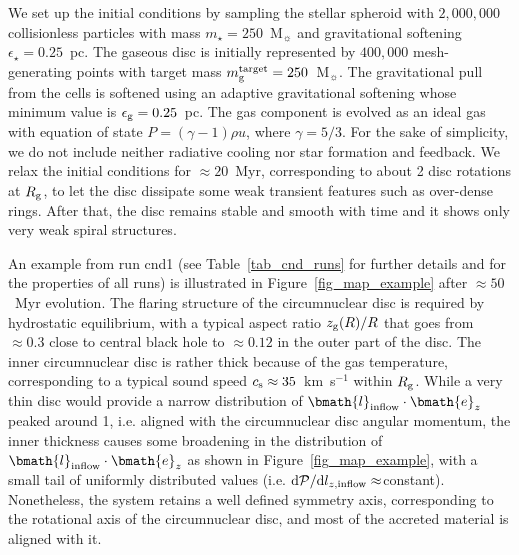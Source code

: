 \documentclass[a4paper,fleqn,usenatbib]{mnras}
\begin{document}
We set up the initial conditions by sampling the stellar spheroid with $2,000,000$ collisionless particles with mass $m_{\star} = 250$~M$_{\sun}$ and gravitational softening $\epsilon_{\star} = 0.25$~pc.
The gaseous disc is initially represented by $400,000$ mesh-generating points with target mass $m_{\rm g}^{\rm target} = 250$~M$_{\sun}$.
The gravitational pull from the cells is softened using an adaptive gravitational softening whose minimum value is $\epsilon_{\rm g} = 0.25$~pc.
The gas component is evolved as an ideal gas with equation of state $P = (\gamma - 1) \rho u$, where $\gamma = 5/3$.
For the sake of simplicity, we do not include neither radiative cooling nor star formation and feedback.
We relax the initial conditions for $\approx 20$~Myr, corresponding to about 2 disc rotations at $R_{\rm g}$, to let the disc dissipate some weak transient features such as over-dense rings.
After that, the disc remains stable and smooth with time and it shows only very weak spiral structures.

An example from run cnd1 (see Table~\ref{tab_cnd_runs} for further details and for the properties of all runs) is illustrated in Figure~\ref{fig_map_example} after $\approx 50$~Myr evolution.
The flaring structure of the circumnuclear disc is required by hydrostatic equilibrium, with a typical aspect ratio $z_{\rm g}(R)/R$ that goes from $\approx 0.3$ close to central black hole to $\approx 0.12$ in the outer part of the disc.
The inner circumnuclear disc is rather thick because of the gas temperature, corresponding to a typical sound speed $c_{\rm s}\approx 35$~km~s$^{-1}$ within $R_{\rm g}$.
While a very thin disc would provide a narrow distribution of $\bmath{l}_{\rm inflow} \cdot \bmath{e}_{z}$ peaked around 1, i.e. aligned with the circumnuclear disc angular momentum, the inner thickness causes some broadening in the distribution of $\bmath{l}_{\rm inflow} \cdot \bmath{e}_{z}$ as shown in Figure~\ref{fig_map_example}, with a small tail of uniformly distributed values (i.e. ${\rm d} \mathcal{P} / {\rm d}l_{z, \rm inflow} \approx$constant).
Nonetheless, the system retains a well defined symmetry axis, corresponding to the rotational axis of the circumnuclear disc, and most of the accreted material is aligned with it.
\end{document}
